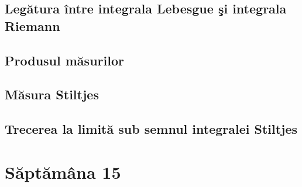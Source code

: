 \documentclass[a4paper,12pt]{article}
\theoremstyle{change}
\begin{document}

\subsection{Legătura între integrala Lebesgue şi integrala Riemann}


\subsection{Produsul măsurilor}


\subsection{Măsura Stiltjes}


\subsection{Trecerea la limită sub semnul integralei Stiltjes}

\section{Săptămâna 15}
\end{document}
